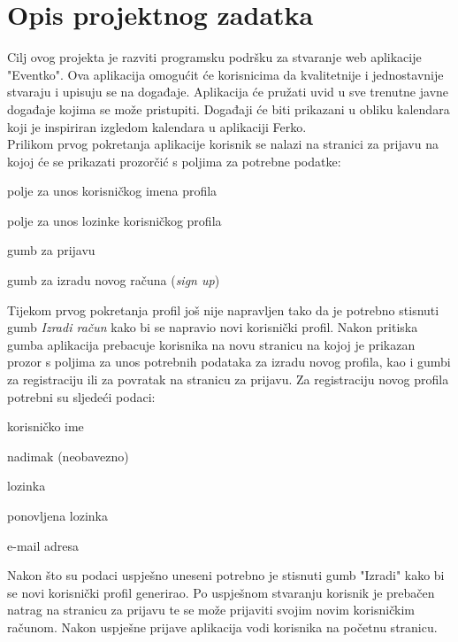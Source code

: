 \chapter{Opis projektnog zadatka}
		
		\indent Cilj ovog projekta je razviti programsku podršku za stvaranje web aplikacije "Eventko". Ova aplikacija omogućit će korisnicima da kvalitetnije i jednostavnije stvaraju i upisuju se na događaje. Aplikacija će pružati uvid u sve trenutne javne događaje kojima se može pristupiti. Događaji će biti prikazani u obliku kalendara koji je inspiriran izgledom kalendara u aplikaciji Ferko. \\
			
		\indent Prilikom prvog pokretanja aplikacije korisnik se nalazi na stranici za prijavu na kojoj će se prikazati prozorčić s poljima za potrebne podatke:
		
		\begin{packed_item}
			\item polje za unos korisničkog imena profila
			\item polje za unos lozinke korisničkog profila
			\item gumb za prijavu
			\item gumb za izradu novog računa (\textit{sign up})
		\end{packed_item}
		
		\indent Tijekom prvog pokretanja profil još nije napravljen tako da je potrebno stisnuti gumb \textit{Izradi račun} kako bi se napravio novi korisnički profil. Nakon pritiska gumba aplikacija prebacuje korisnika na novu stranicu na kojoj je prikazan prozor s poljima za unos potrebnih podataka za izradu novog profila, kao i gumbi za registraciju ili za povratak na stranicu za prijavu. Za registraciju novog profila potrebni su sljedeći podaci:
		
		\begin{packed_item}
			\item korisničko ime
			\item nadimak (neobavezno)
			\item lozinka
			\item ponovljena lozinka
			\item e-mail adresa
		\end{packed_item}
	
		\indent Nakon što su podaci uspješno uneseni potrebno je stisnuti gumb "Izradi" kako bi se novi korisnički profil generirao. Po uspješnom stvaranju korisnik je prebačen natrag na stranicu za prijavu te se može prijaviti svojim novim korisničkim računom. Nakon uspješne prijave aplikacija vodi korisnika na početnu stranicu.
		\eject
		
